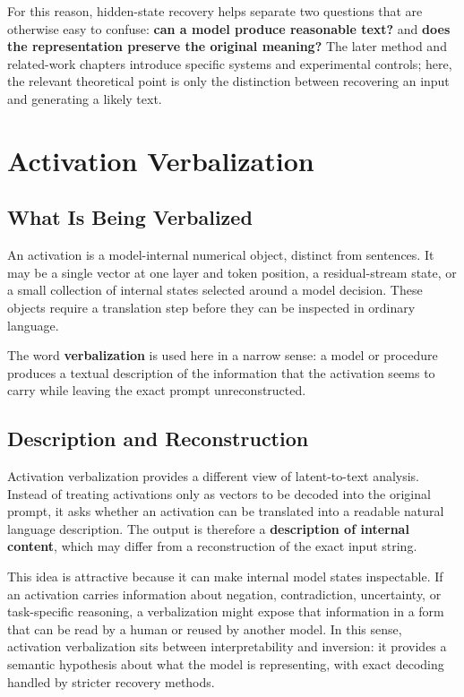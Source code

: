 \documentclass[12pt,a4paper,twoside,openright]{book}
\begin{document}
For this reason, hidden-state recovery helps separate two questions that are
otherwise easy to confuse: \textbf{can a model produce reasonable text?} and
\textbf{does the representation preserve the original meaning?} The later
method and related-work chapters introduce specific systems and experimental
controls; here, the relevant theoretical point is only the distinction between
recovering an input and generating a likely text.

\section{Activation Verbalization}

\subsection{What Is Being Verbalized}

An activation is a model-internal numerical object, distinct from sentences. It may be a
single vector at one layer and token position, a residual-stream state, or a
small collection of internal states selected around a model decision. These
objects require a translation step before they can be inspected in ordinary
language.

The word \textbf{verbalization} is used here in a narrow sense: a model or
procedure produces a textual description of the information that the activation
seems to carry while leaving the exact prompt unreconstructed.

\subsection{Description and Reconstruction}

Activation verbalization provides a different view of latent-to-text analysis.
Instead of treating activations only as vectors to be decoded into the original
prompt, it asks whether an activation can be translated into a readable natural
language description. The output is therefore a \textbf{description of internal
content}, which may differ from a reconstruction of the exact input string.

This idea is attractive because it can make internal model states inspectable.
If an activation carries information about negation, contradiction, uncertainty,
or task-specific reasoning, a verbalization might expose that information in a
form that can be read by a human or reused by another model. In this sense,
activation verbalization sits between interpretability and inversion: it
provides a semantic hypothesis about what the model is representing, with exact
decoding handled by stricter recovery methods.
\end{document}

